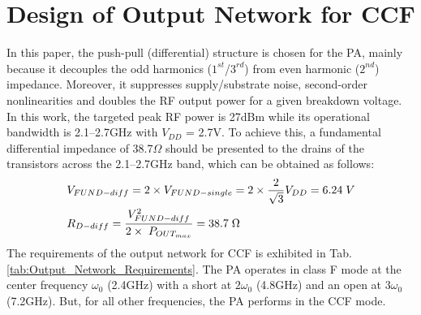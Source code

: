 \documentclass[conference]{IEEEtran}
\begin{document}
 

\section{Design of Output Network for CCF}
\label{section:ON}
In this paper, the push-pull (differential) structure is chosen for the PA, mainly because it decouples the odd harmonics ($1^{st}$/$3^{rd}$) from even harmonic ($2^{nd}$) impedance. Moreover, it suppresses supply/substrate noise, second-order nonlinearities and doubles the RF output power for a given breakdown voltage. 
In this work, the targeted peak RF power is 27dBm  while its operational bandwidth is 2.1--2.7GHz with $V_{DD}$ = 2.7V. To achieve this, a  fundamental differential impedance of 38.7$\Omega$ should be presented to the drains of the transistors across the 2.1--2.7GHz band, which can be obtained as follows:
\vspace{-0.05in}
\begin{equation}
\begin{aligned}
&V_{FUND-diff}=2\times V_{FUND-single}=2\times\frac{2}{\sqrt{3}} V_{DD}=6.24 \hspace{1mm}V\\
&R_{D-diff}=\frac{V_{FUND-diff}^{2}}{2\times\hspace{1mm} P_{OUT_{max}}}=38.7 \hspace{1mm} \Omega
\label{eqn_diff_imp}
\end{aligned}
\end{equation}
The requirements of the output network for CCF is exhibited in Tab. \ref{tab:Output_Network_Requirements}. The PA operates in class F mode at the center frequency $\omega_0$ (2.4GHz) with a short at $2\omega_0$ (4.8GHz) and an open at $3\omega_0$ (7.2GHz). But, for all other frequencies, the PA performs in the CCF mode. 
\end{document}
